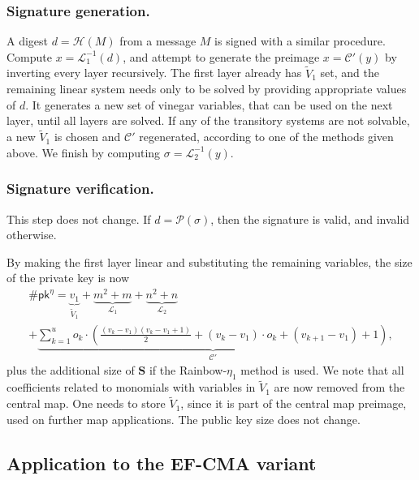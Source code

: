 \documentclass[draft, 12pt, a4paper, oneside]{memoir}
\theoremstyle{definition}
\begin{document}
\subsubsection{Signature generation.}

A digest $d = \mathcal{H}(M)$ from a message $M$ is signed with a similar
procedure. Compute $x = \mathcal{L}_{1}^{-1}(d)$, and attempt to generate the preimage
$x = \mathcal{C}'(y)$ by inverting every layer recursively. The first
layer already has $\widetilde{V}_{1}$ set, and the remaining linear system
needs only to be solved by providing appropriate values of $d$. It
generates a new set of vinegar variables, that can be used on the next layer,
until all layers are solved. If any of the transitory systems are not solvable,
a new $\widetilde{V}_{1}$ is chosen and $\mathcal{C}'$ regenerated, according
to one of the methods given above. We finish by computing
$\sigma = \mathcal{L}_{2}^{-1}(y)$.

\subsubsection{Signature verification.}

This step does not change. If $d = \mathcal{P}(\sigma)$, then the signature is
valid, and invalid otherwise.

By making the first layer linear and substituting the remaining variables, the
size of the private key is now
\begin{multline}
  \#\mathsf{pk}^{\eta} = \underbrace{v_{1}}_{\widetilde{V}_{1}}
    + \underbrace{m^{2} + m}_{\mathcal{L}_{1}}
    + \underbrace{n^{2} + n}_{\mathcal{L}_{2}} \\
    + \underbrace{\sum_{k = 1}^{u} o_{k} \cdot \left( \frac{(v_{k} - v_{1})(v_{k} - v_{1} + 1)}{2}
      + (v_{k} - v_{1}) \cdot o_{k} + (v_{k + 1} - v_{1}) + 1 \right)}_{\mathcal{C}'},
\end{multline}
plus the additional size of $\mathbf{S}$ if the Rainbow-$\eta_{1}$ method is
used. We note that all coefficients related to monomials with variables in $\widetilde{V}_{1}$ are now removed from the central map. One needs to store $\widetilde{V}_{1}$, since it is part of the central
map preimage, used on further map applications. The public key size does not
change.

\subsection{Application to the EF-CMA variant}\label{subsec:efcma}
\end{document}
